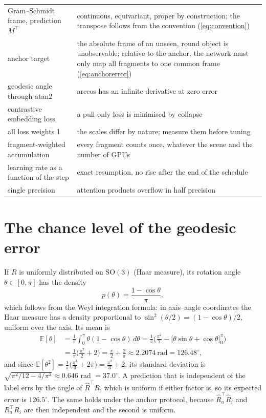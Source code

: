 \documentclass[11pt,a4paper]{article}
\theoremstyle{remark}
\newcommand{\SO}{\mathrm{SO}(3)}
\newcommand{\T}{^{\top}}
\begin{document}
\begin{minipage}{\linewidth}
\begin{tabularx}{\linewidth}{@{}>{\raggedright\arraybackslash}p{4.8cm}X@{}}
Gram--Schmidt frame, prediction $M\T$ & continuous, equivariant, proper by construction; the transpose follows from the convention (\cref{eq:convention}) \\
anchor target & the absolute frame of an unseen, round object is unobservable; relative to the anchor, the network must only map all fragments to one common frame (\cref{eq:anchorerror}) \\
geodesic angle through atan2 & arccos has an infinite derivative at zero error \\
contrastive embedding loss & a pull-only loss is minimised by collapse \\
all loss weights 1 & the scales differ by nature; measure them before tuning \\
fragment-weighted accumulation & every fragment counts once, whatever the scene and the number of GPUs \\
learning rate as a function of the step & exact resumption, no rise after the end of the schedule \\
single precision & attention products overflow in half precision \\
\bottomrule
\end{tabularx}
\end{minipage}

\appendix

\section{The chance level of the geodesic error}
\label{app:chance}
If $R$ is uniformly distributed on $\SO$ (Haar measure), its rotation angle $\theta\in[0,\pi]$ has the density
\begin{equation}
  p(\theta)=\frac{1-\cos\theta}{\pi},
\end{equation}
which follows from the Weyl integration formula: in axis--angle coordinates the Haar measure has a density proportional to $\sin^2(\theta/2)=(1-\cos\theta)/2$, uniform over the axis. Its mean is
\begin{equation}
  \begin{aligned}
  \mathbb E[\theta]&=\frac1\pi\int_0^\pi\theta(1-\cos\theta)\,d\theta
  =\frac1\pi\Big(\frac{\pi^2}2-\big[\theta\sin\theta+\cos\theta\big]_0^\pi\Big)\\
  &=\frac1\pi\Big(\frac{\pi^2}2+2\Big)=\frac\pi2+\frac2\pi\approx2.2074\ \text{rad}=126.48^\circ,
  \end{aligned}
\end{equation}
and since $\mathbb E[\theta^2]=\frac1\pi\big(\frac{\pi^3}3+2\pi\big)=\frac{\pi^2}3+2$, its standard deviation is $\sqrt{\pi^2/12-4/\pi^2}\approx0.646$ rad $=37.0^\circ$. A prediction that is independent of the label errs by the angle of $\hat R\T R$, which is uniform if either factor is, so its expected error is $126.5^\circ$. The same holds under the anchor protocol, because $\hat R_a\T\hat R_i$ and $R_a\T R_i$ are then independent and the second is uniform.
\end{document}
